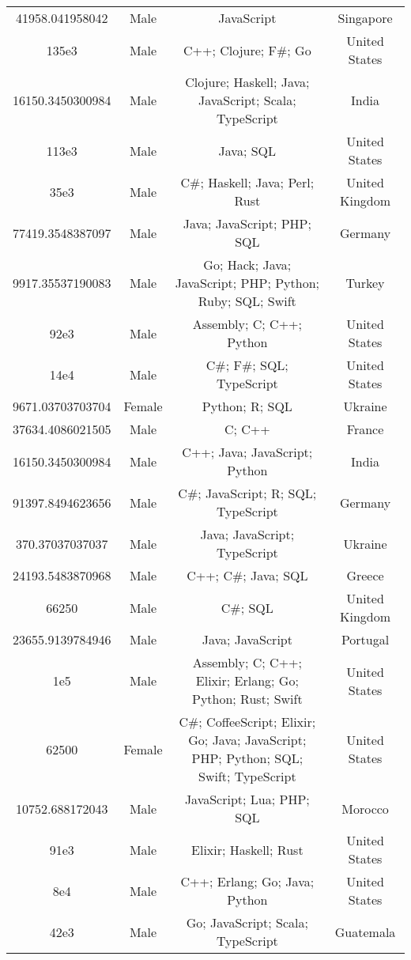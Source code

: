 \begin{center}
\begin{tabular}{ |c|c|c|c| }
41958.041958042  &  Male  &  JavaScript  &  Singapore  \\ 
135e3  &  Male  &  C++; Clojure; F\#; Go  &  United States  \\ 
16150.3450300984  &  Male  &  Clojure; Haskell; Java; JavaScript; Scala; TypeScript  &  India  \\ 
113e3  &  Male  &  Java; SQL  &  United States  \\ 
35e3  &  Male  &  C\#; Haskell; Java; Perl; Rust  &  United Kingdom  \\ 
77419.3548387097  &  Male  &  Java; JavaScript; PHP; SQL  &  Germany  \\ 
9917.35537190083  &  Male  &  Go; Hack; Java; JavaScript; PHP; Python; Ruby; SQL; Swift  &  Turkey  \\ 
92e3  &  Male  &  Assembly; C; C++; Python  &  United States  \\ 
14e4  &  Male  &  C\#; F\#; SQL; TypeScript  &  United States  \\ 
9671.03703703704  &  Female  &  Python; R; SQL  &  Ukraine  \\ 
37634.4086021505  &  Male  &  C; C++  &  France  \\ 
16150.3450300984  &  Male  &  C++; Java; JavaScript; Python  &  India  \\ 
91397.8494623656  &  Male  &  C\#; JavaScript; R; SQL; TypeScript  &  Germany  \\ 
370.37037037037  &  Male  &  Java; JavaScript; TypeScript  &  Ukraine  \\ 
24193.5483870968  &  Male  &  C++; C\#; Java; SQL  &  Greece  \\ 
66250  &  Male  &  C\#; SQL  &  United Kingdom  \\ 
23655.9139784946  &  Male  &  Java; JavaScript  &  Portugal  \\ 
1e5  &  Male  &  Assembly; C; C++; Elixir; Erlang; Go; Python; Rust; Swift  &  United States  \\ 
62500  &  Female  &  C\#; CoffeeScript; Elixir; Go; Java; JavaScript; PHP; Python; SQL; Swift; TypeScript  &  United States  \\ 
10752.688172043  &  Male  &  JavaScript; Lua; PHP; SQL  &  Morocco  \\ 
91e3  &  Male  &  Elixir; Haskell; Rust  &  United States  \\ 
8e4  &  Male  &  C++; Erlang; Go; Java; Python  &  United States  \\ 
42e3  &  Male  &  Go; JavaScript; Scala; TypeScript  &  Guatemala  \\ 

\end{tabular}
\end{center}
